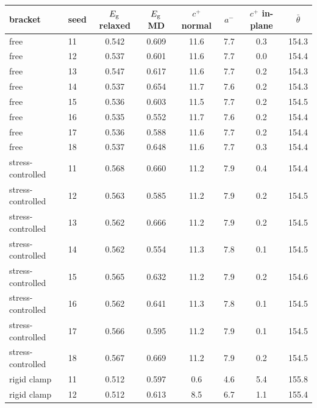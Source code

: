 \begin{table}[htbp]
\centering\footnotesize
\changedcolor
\caption{\protect{}}
\label{tab:si-gap-relaxed}
\begin{tabular}{llcccccc}
\toprule bracket & seed & $E_\mathrm{g}$ relaxed & $E_\mathrm{g}$ MD & $c^+$ normal & $a^-$ & $c^+$ in-plane & $\bar\theta$ \\ \midrule
free & 11 & 0.542 & 0.609 & 11.6 & 7.7 & 0.3 & 154.3 \\
free & 12 & 0.537 & 0.601 & 11.6 & 7.7 & 0.0 & 154.4 \\
free & 13 & 0.547 & 0.617 & 11.6 & 7.7 & 0.2 & 154.3 \\
free & 14 & 0.537 & 0.654 & 11.7 & 7.6 & 0.2 & 154.3 \\
free & 15 & 0.536 & 0.603 & 11.5 & 7.7 & 0.2 & 154.5 \\
free & 16 & 0.535 & 0.552 & 11.7 & 7.6 & 0.2 & 154.4 \\
free & 17 & 0.536 & 0.588 & 11.6 & 7.7 & 0.2 & 154.4 \\
free & 18 & 0.537 & 0.648 & 11.6 & 7.7 & 0.3 & 154.4 \\
stress-controlled & 11 & 0.568 & 0.660 & 11.2 & 7.9 & 0.4 & 154.4 \\
stress-controlled & 12 & 0.563 & 0.585 & 11.2 & 7.9 & 0.2 & 154.5 \\
stress-controlled & 13 & 0.562 & 0.666 & 11.2 & 7.9 & 0.2 & 154.5 \\
stress-controlled & 14 & 0.562 & 0.554 & 11.3 & 7.8 & 0.1 & 154.5 \\
stress-controlled & 15 & 0.565 & 0.632 & 11.2 & 7.9 & 0.2 & 154.6 \\
stress-controlled & 16 & 0.562 & 0.641 & 11.3 & 7.8 & 0.1 & 154.5 \\
stress-controlled & 17 & 0.566 & 0.595 & 11.2 & 7.9 & 0.1 & 154.5 \\
stress-controlled & 18 & 0.567 & 0.669 & 11.2 & 7.9 & 0.2 & 154.5 \\
rigid clamp & 11 & 0.512 & 0.597 & 0.6 & 4.6 & 5.4 & 155.8 \\
rigid clamp & 12 & 0.512 & 0.613 & 8.5 & 6.7 & 1.1 & 155.4 \\

\end{tabular}
\end{table}
